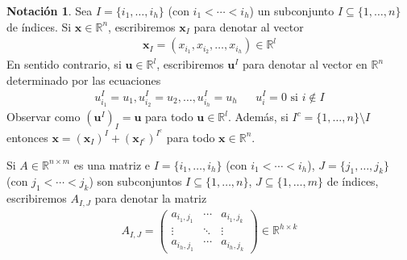 \documentclass{report}
\newcommand{\realNumbers}{\mathbb{R}}
\theoremstyle{definition}
\newtheorem{notation}{Notación}
\theoremstyle{remark}
\begin{document}
  \begin{notation}
    Sea \(I = \{i_1, \dots, i_h\}\) (con \(i_1 < \cdots < i_h\)) un subconjunto \(I \subseteq \{1, \dots, n\}\) de índices.
    Si \(\mathbf{x} \in \realNumbers^n\), escribiremos \(\mathbf{x}_I\) para denotar al vector
    \begin{align}
      \mathbf{x}_I
      =
      (x_{i_1}, x_{i_2}, \dots, x_{i_h})
      \in
      \realNumbers^l
    \end{align}
    En sentido contrario, si \(\mathbf{u} \in \realNumbers^l\), escribiremos \(\mathbf{u}^I\) para denotar al vector en \(\realNumbers^n\) determinado por las ecuaciones
    \begin{align}
      u^I_{i_1} = u_1,
      u^I_{i_2} = u_2,
      \dots,
      u^I_{i_h} = u_h
      &&
      u^I_i = 0
      \text{ si }
      i \notin I
    \end{align}
    Observar como \((\mathbf{u}^I)_I = \mathbf{u}\) para todo \(\mathbf{u} \in \realNumbers^l\).
    Además, si \(I^c = \{1, \dots, n\} \setminus I\) entonces \(\mathbf{x} = (\mathbf{x}_I)^I + (\mathbf{x}_{I^c})^{I^c}\) para todo \(\mathbf{x} \in \realNumbers^n\).

    Si \(A \in \realNumbers^{n \times m}\) es una matriz e \(I = \{i_1, \dots, i_h\}\) (con \(i_1 < \cdots < i_h\)), \(J = \{j_1, \dots, j_k\}\)  (con \(j_1 < \cdots < j_k\)) son subconjuntos \(I \subseteq \{1, \dots, n\}\), \(J \subseteq \{1, \dots, m\}\) de índices, escribiremos \(A_{I, J}\) para denotar la matriz
    \begin{align}
      A_{I, J}
      =
      \begin{pmatrix}
        a_{i_1, j_1} &\cdots &a_{i_1, j_k}
        \\
        \vdots &\ddots &\vdots
        \\
        a_{i_h, j_1} &\cdots &a_{i_h, j_k}
      \end{pmatrix}
      \in
      \realNumbers^{h \times k}
    \end{align}
  \end{notation}
\end{document}
